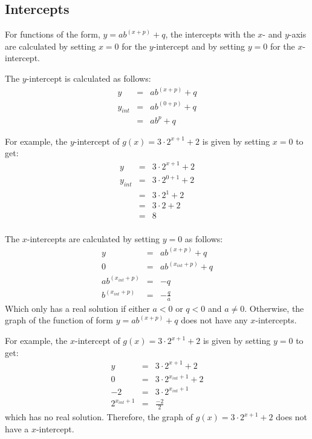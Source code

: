 
\subsection{Intercepts}
For functions of the form, $y=ab^{(x+p)} + q$, the intercepts with the $x$- and $y$-axis are calculated by setting $x=0$ for the $y$-intercept and by setting $y=0$ for the $x$-intercept.

The $y$-intercept is calculated as follows:
\begin{eqnarray}
y&=&ab^{(x+p)} + q\\
y_{int}&=&ab^{(0+p)} + q\\
&=&ab^p + q
\end{eqnarray}

For example, the $y$-intercept of $g(x)=3\cdot 2^{x+1} + 2$ is given by setting $x=0$ to get:
\begin{eqnarray*}
y&=&3\cdot 2^{x+1} + 2\\
y_{int}&=&3\cdot 2^{0+1} + 2\\
&=&3\cdot 2^{1} + 2\\
&=&3 \cdot 2 + 2\\
&=&8\\
\end{eqnarray*}

The $x$-intercepts are calculated by setting $y=0$ as follows:
\begin{eqnarray}
y&=&ab^{(x+p)} + q\\
0&=&ab^{(x_{int}+p)} + q\\
ab^{(x_{int}+p)}&=&-q\\
b^{(x_{int}+p)}&=&-\frac{q}{a}
\end{eqnarray}
Which only has a real solution if either $a<0$ or $q<0$ and $a\neq0$. Otherwise, the graph of the function of form $y=ab^{(x+p)} + q$ does not have any $x$-intercepts.

For example, the $x$-intercept of $g(x)=3\cdot 2^{x+1} + 2$ is given by setting $y=0$ to get:
\begin{eqnarray*}
y&=&3\cdot 2^{x+1} + 2\\
0&=&3\cdot 2^{x_{int}+1} + 2\\
-2&=&3\cdot 2^{x_{int}+1}\\
2^{x_{int}+1}&=&\frac{-2}{2}
\end{eqnarray*}
which has no real solution. Therefore, the graph of $g(x)=3\cdot 2^{x+1} + 2$ does not have a $x$-intercept.

